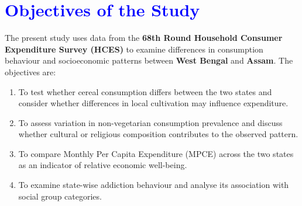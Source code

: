 \section{\textcolor{blue}{Objectives of the Study}}

The present study uses data from the \textbf{\textcolor{deepgreen}{68th Round Household Consumer Expenditure Survey (HCES)}} to examine differences in consumption behaviour and socioeconomic patterns between \textbf{\textcolor{deepgreen}{West Bengal}} and \textbf{\textcolor{deepgreen}{Assam}}. The objectives are:

\begin{enumerate}
    \item To test whether cereal consumption differs between the two states and consider whether differences in local cultivation may influence expenditure.
    \item To assess variation in non-vegetarian consumption prevalence and discuss whether cultural or religious composition contributes to the observed pattern.
    \item To compare Monthly Per Capita Expenditure (MPCE) across the two states as an indicator of relative economic well-being.
    \item To examine state-wise addiction behaviour and analyse its association with social group categories.
\end{enumerate}
